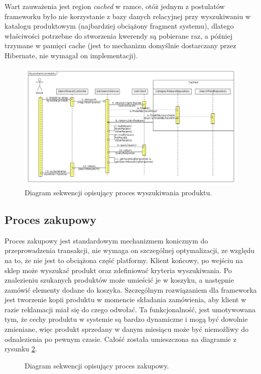 Wart zauważenia jest region \textit{cached} w ramce, otóż jednym z postulatów frameworku było nie korzystanie z bazy danych relacyjnej przy wyszukiwaniu w katalogu produktowym (najbardziej obciążony fragment systemu), dlatego właściwości potrzebne do stworzenia kwerendy są pobierane raz, a później trzymane w pamięci cache (jest to mechanizm domyślnie dostarczany przez Hibernate, nie wymagał on implementacji). 
  \begin{figure}
	\begin{center}
		\includegraphics[scale=0.38]{wyszukanieProdSekw.png}
	\end{center}
	\caption{{\color{black}Diagram sekwencji opisujący proces wyszukiwania produktu.}} \label{wyszukiwanieProdSekw}
\end{figure}



\subsection{Proces zakupowy}
Proces zakupowy jest standardowym mechanizmem konicznym do przeprowadzenia transakcji, nie wymaga on szczególnej optymalizacji, ze względu na to, że nie jest to obciążona część platformy. Klient końcowy, po wejściu na sklep może wyszukać produkt oraz zdefiniować kryteria wyszukiwania. Po znalezieniu szukanych produktów może umieścić je w koszyku, a następnie zamówić elementy dodane do koszyka. Szczególnym rozwiązaniem dla frameworka jest tworzenie kopii produktu w momencie składania zamówienia, aby klient w razie reklamacji miał się do czego odwołać. Ta funkcjonalność, jest umotywowana tym, że cechy produktu w systemie są bardzo dynamiczne i mogą być dowolnie zmieniane, więc produkt sprzedany w danym miesiącu może być niemożliwy do odnalezienia po pewnym czasie. Całość została umieszczona na diagramie z rysunku \ref{procZakup}.
\begin{figure}
	\begin{center}
	\end{center}
	\caption{{\color{black}Diagram sekwencji opisujący proces zakupowy.}} \label{procZakup}
\end{figure}


